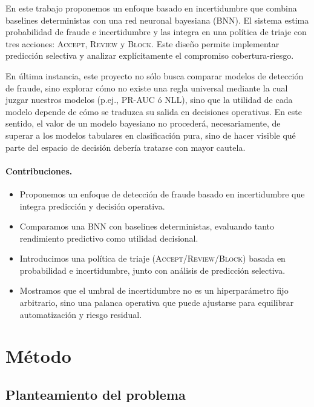 \documentclass{article}
\begin{document}
En este trabajo proponemos un enfoque basado en incertidumbre que combina baselines deterministas con una red neuronal bayesiana (BNN). El sistema estima probabilidad de fraude e incertidumbre y las integra en una política de triaje con tres acciones: \textsc{Accept}, \textsc{Review} y \textsc{Block}. Este diseño permite implementar predicción selectiva y analizar explícitamente el compromiso cobertura-riesgo.

En última instancia, este proyecto no sólo busca comparar modelos de detección de fraude, sino explorar cómo no existe una regla universal mediante la cual juzgar nuestros modelos (p.ej., PR-AUC ó NLL), sino que la utilidad de cada modelo depende de cómo se traduzca su salida en decisiones operativas. En este sentido, el valor de un modelo bayesiano no procederá, necesariamente, de superar a los modelos tabulares en clasificación pura, sino de hacer visible qué parte del espacio de decisión debería tratarse con mayor cautela.

\newpage

\paragraph{Contribuciones.}
\begin{itemize}
    \item Proponemos un enfoque de detección de fraude basado en incertidumbre que integra predicción y decisión operativa.
    \item Comparamos una BNN con baselines deterministas, evaluando tanto rendimiento predictivo como utilidad decisional.
    \item Introducimos una política de triaje (\textsc{Accept/Review/Block}) basada en probabilidad e incertidumbre, junto con análisis de predicción selectiva.
    \item Mostramos que el umbral de incertidumbre no es un hiperparámetro fijo arbitrario, sino una palanca operativa que puede ajustarse para equilibrar automatización y riesgo residual.
\end{itemize}

\section{Método}

\subsection{Planteamiento del problema}
\end{document}
